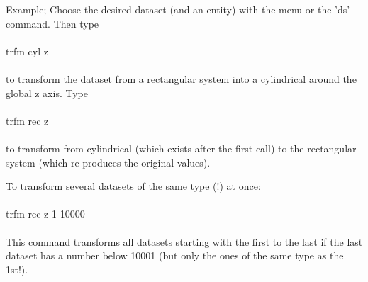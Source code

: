 \documentclass{article}
\begin{document}
Example; Choose the desired dataset (and an entity) with the menu or the 'ds' command. Then type\\\\

trfm cyl z\\\\

to transform the dataset from a rectangular system into a cylindrical around the global z axis. Type\\\\

trfm rec z\\\\

to transform from cylindrical (which exists after the first call) to 
the rectangular system (which re-produces the original values).

To transform several datasets of the same type (!) at once:\\\\

trfm rec z 1 10000\\\\

This command transforms all datasets starting with the first to the last if the 
last dataset has a number below 10001 (but only the ones of the same type as 
the 1st!).
\end{document}
